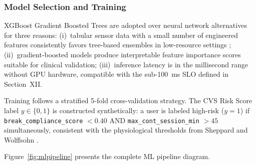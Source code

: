 \documentclass[conference]{IEEEtran}
\begin{document}
\subsubsection{Model Selection and Training}

XGBoost Gradient Boosted Trees are adopted over neural network alternatives for three
reasons: (i)~tabular sensor data with a small number of engineered features consistently
favors tree-based ensembles in low-resource settings \cite{b19}; (ii)~gradient-boosted
models produce interpretable feature importance scores suitable for clinical validation;
(iii)~inference latency is in the millisecond range without GPU hardware, compatible
with the sub-100~ms SLO defined in Section~XII.

Training follows a stratified 5-fold cross-validation strategy. The CVS Risk Score
label $y \in \{0,1\}$ is constructed synthetically: a user is labeled high-risk
($y=1$) if \texttt{break\_compliance\_score} $< 0.40$ AND
\texttt{max\_cont\_session\_min} $> 45$ simultaneously, consistent with the
physiological thresholds from Sheppard and Wolffsohn \cite{b2}.

Figure~\ref{fig:mlpipeline} presents the complete ML pipeline diagram.
\end{document}
